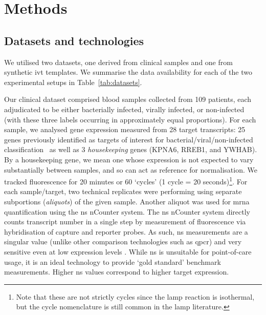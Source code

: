\documentclass[../thesis.tex]{subfiles}
\begin{document}
\section{Methods}
\subsection{Datasets and technologies \label{sec:data}}
We utilised two datasets, one derived from clinical samples and one from synthetic \gls{ivt}  templates. We summarise the data availability for each of the two experimental setups in Table~\ref{tab:datasets}. 

Our clinical dataset comprised blood samples collected from 109 patients, each adjudicated to be either bacterially infected, virally infected, or non-infected (with these three labels occurring in approximately equal proportions). For each sample, we analysed gene expression measured from 28 target  transcripts: 25 genes previously identified as targets of interest for bacterial/viral/non-infected classification~\citep{he_optimization_2021} as well as 3 \emph{housekeeping} genes (KPNA6, RREB1, and YWHAB). By a housekeeping gene, we mean one whose expression is not expected to vary substantially between samples, and so can act as reference for normalisation. We tracked fluorescence for 20 minutes or 60 `cycles' (1 cycle = 20 seconds)\footnote{Note that these are not strictly cycles since the \gls{lamp} reaction is isothermal, but the cycle nomenclature is still common in the \gls{lamp} literature.}. For each sample/target, two technical replicates were performing using separate subportions (\emph{aliquots}) of the given sample. Another aliquot was used for \gls{mrna} quantification using the \gls{ns} nCounter system. The \gls{ns} nCounter system  directly counts  transcript number in a single step by measurement of fluorescence via hybridisation of capture and reporter probes. As such, \gls{ns} measurements are a singular value (unlike other comparison technologies such as \gls{qpcr}) and very sensitive even at low expression levels \citep{geiss_direct_2008}. While \gls{ns} is unsuitable for point-of-care usage, it is an ideal technology to provide `gold standard' benchmark measurements. Higher \gls{ns} values correspond to higher target expression. 
\end{document}
